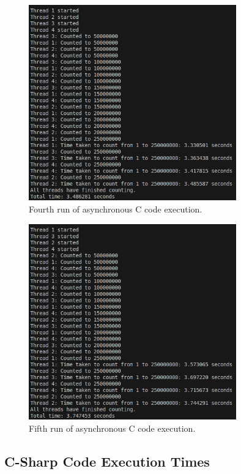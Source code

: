 \documentclass[12pt,a4paper]{article}
\begin{document}
\begin{figure}[htbp]
    \centering
    \includegraphics[width=0.8\textwidth]{../async_records/results_c/result_4.png}
    \caption{Fourth run of asynchronous C code execution.}
    \label{fig:C-async-runtime-4}
\end{figure}

\begin{figure}[htbp]
    \centering
    \includegraphics[width=0.8\textwidth]{../async_records/results_c/result_5.png}
    \caption{Fifth run of asynchronous C code execution.}
    \label{fig:C-async-runtime-5}
\end{figure}

\clearpage
\subsection{C-Sharp Code Execution Times} 
\end{document}
